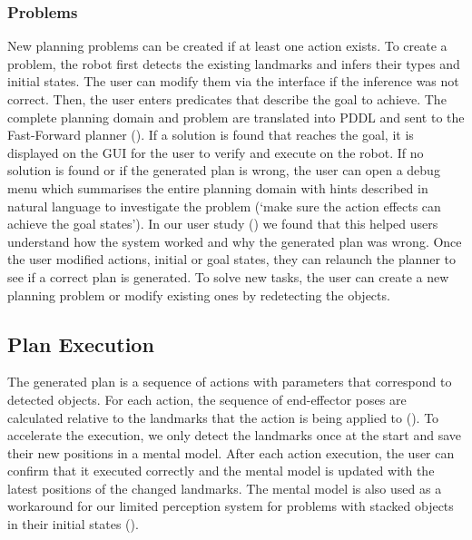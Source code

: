 \subsubsection*{Problems} New planning problems can be created if at least one action exists.
To create a problem, the robot first detects the existing landmarks and infers their types and initial states.
The user can modify them via the interface if the inference was not correct.
Then, the user enters predicates that describe the goal to achieve.
The complete planning domain and problem are translated into PDDL and sent to the Fast-Forward planner (\cite{hoffmann2001ff}).
If a solution is found that reaches the goal, it is displayed on the GUI for the user to verify and execute on the robot.
If no solution is found or if the generated plan is wrong, the user can open a debug menu which summarises the entire planning domain with hints described in natural language to investigate the problem (\eg `make sure the action effects can achieve the goal states').
In our user study () we found that this helped users understand how the system worked and why the generated plan was wrong.
Once the user modified actions, initial or goal states, they can relaunch the planner to see if a correct plan is generated.
To solve new tasks, the user can create a new planning problem or modify existing ones by redetecting the objects.


\subsection{Plan Execution} 
The generated plan is a sequence of actions with parameters that correspond to detected objects.
For each action, the sequence of end-effector poses are calculated relative to the landmarks that the action is being applied to ().
To accelerate the execution, we only detect the landmarks once at the start and save their new positions in a mental model.
After each action execution, the user can confirm that it executed correctly and the mental model is updated with the latest positions of the changed landmarks.
The mental model is also used as a workaround for our limited perception system for problems with stacked objects in their initial states ().


